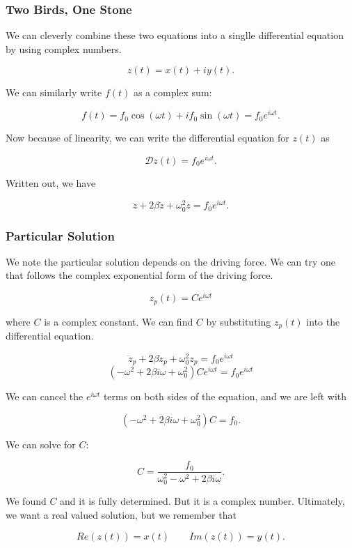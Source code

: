 \documentclass[11pt]{article}
\begin{document}
\subsubsection{Two Birds, One Stone}\label{two-birds-one-stone}

We can cleverly combine these two equations into a singlle differential
equation by using complex numbers.

\[z(t) = x(t) + i y(t).\]

We can similarly write \(f(t)\) as a complex sum:

\[f(t) = f_0 \cos(\omega t) + i f_0 \sin(\omega t) = f_0 e^{i \omega t}.\]

Now because of linearity, we can write the differential equation for
\(z(t)\) as

\[\mathcal{D} z(t) = f_0 e^{i \omega t}.\]

Written out, we have

\[\ddot{z} + 2\beta \dot{z} + \omega_0^2 z = f_0 e^{i \omega t}.\]

\subsubsection{Particular Solution}\label{particular-solution}

We note the particular solution depends on the driving force. We can try
one that follows the complex exponential form of the driving force.

\[z_p(t) = C e^{i \omega t}\]

where \(C\) is a complex constant. We can find \(C\) by substituting
\(z_p(t)\) into the differential equation.

\[\ddot{z}_p + 2\beta \dot{z}_p + \omega_0^2 z_p = f_0 e^{i \omega t}\]
\[\left(-\omega^2 + 2\beta i \omega + \omega_0^2\right) C e^{i \omega t} = f_0 e^{i \omega t}\]

We can cancel the \(e^{i \omega t}\) terms on both sides of the
equation, and we are left with

\[\left(-\omega^2 + 2\beta i \omega + \omega_0^2\right) C = f_0.\]

We can solve for \(C\):

\[C = \dfrac{f_0}{\omega_0^2 - \omega^2 + 2\beta i \omega}.\]

We found \(C\) and it is fully determined. But it is a complex number.
Ultimately, we want a real valued solution, but we remember that

\[Re(z(t)) = x(t) \qquad Im(z(t)) = y(t).\]
\end{document}
